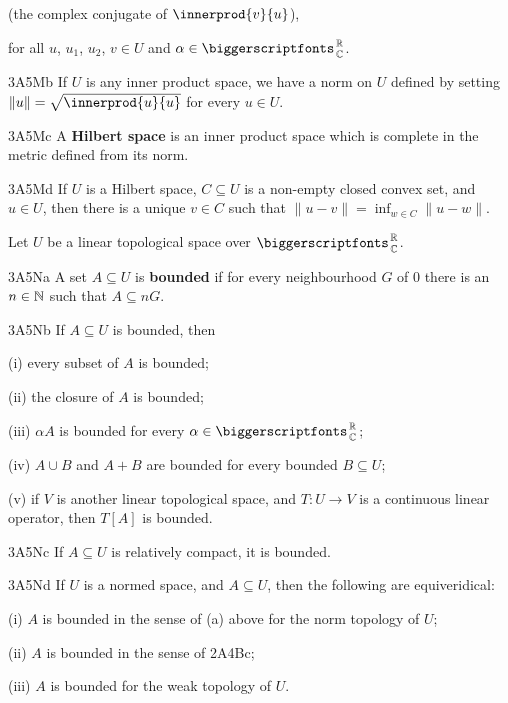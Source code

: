 
\noindent (the complex conjugate of $\innerprod{v}{u}$),


\noindent for all $u$, $u_1$, $u_2$, $v\in U$ and $\alpha \in\RoverC$.

\spheader 3A5Mb If $U$ is any inner product space, we have a norm on $U$
defined by setting $\|u\|=\sqrt{\innerprod{u}{u}}$ for every $u\in U$.

\spheader 3A5Mc A {\bf Hilbert space} is an inner product space which
is
complete in the metric defined from its norm.

\spheader 3A5Md If $U$ is a Hilbert space, $C\subseteq U$ is a non-empty
closed convex set, and $u\in U$, then there is a unique $v\in C$ such
that $\|u-v\|=\inf_{w\in C}\|u-w\|$.  

Let $U$ be a linear topological space over $\RoverC$.

\spheader 3A5Na A set
$A\subseteq U$ is {\bf bounded} if for every neighbourhood $G$ of $0$ 
there is an $n\in\Bbb N$ such that $A\subseteq nG$.

\spheader 3A5Nb If $A\subseteq U$ is bounded, then

\quad(i) every subset of $A$ is bounded;

\quad(ii) the closure of $A$ is bounded;

\quad(iii) $\alpha A$ is bounded for every $\alpha\in\RoverC$;

\quad(iv) $A\cup B$ and $A+B$ are bounded for every bounded $B\subseteq U$;

\quad(v) if $V$ is another linear topological space, 
and $T:U\to V$ is a continuous linear operator, then $T[A]$ is bounded.

\spheader 3A5Nc If $A\subseteq U$ is relatively compact, it is bounded.

\spheader 3A5Nd If $U$ is a normed space, and $A\subseteq U$, then the
following are equiveridical:

\quad(i) $A$ is bounded in the sense of (a) above for the norm topology of
$U$;

\quad(ii) $A$ is bounded in the sense of 2A4Bc;

\quad(iii) $A$ is bounded for the weak topology of $U$.


\discrpage

